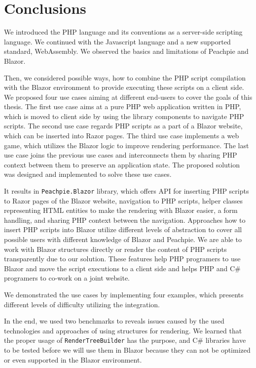 \chapter{Conclusions}

We introduced the PHP language and its conventions as a server-side scripting language.
We continued with the Javascript language and a new supported standard, WebAssembly.
We observed the basics and limitations of Peachpie and Blazor.
\par
Then, we considered possible ways, how to combine the PHP script compilation with the Blazor environment to provide executing these scripts on a client side.
We proposed four use cases aiming at different end-users to cover the goals of this thesis.
The first use case aims at a pure PHP web application written in PHP, which is moved to client side by using the library components to navigate PHP scripts.
The second use case regards PHP scripts as a part of a Blazor website, which can be inserted into Razor pages.
The third use case implements a web game, which utilizes the Blazor logic to improve rendering performance.
The last use case joins the previous use cases and interconnects them by sharing PHP context between them to preserve an application state.  
The proposed solution was designed and implemented to solve these use cases.
\par
It results in \texttt{Peachpie.Blazor} library, which offers API for inserting PHP scripts to Razor pages of the Blazor website, navigation to PHP scripts, helper classes representing HTML entities to make the rendering with Blazor easier, a form handling, and sharing PHP context between the navigation.
Approaches how to insert PHP scripts into Blazor utilize different levels of abstraction to cover all possible users with different knowledge of Blazor and Peachpie.
We are able to work with Blazor structures directly or render the content of PHP scripts transparently due to our solution.
These features help PHP programers to use Blazor and move the script executions to a client side and helps PHP and C\# programers to co-work on a joint website.
\par
We demonstrated the use cases by implementing four examples, which presents different levels of difficulty utilizing the integration.
\par
In the end, we used two benchmarks to reveals issues caused by the used technologies and approaches of using structures for rendering.
We learned that the proper usage of \texttt{RenderTreeBuilder} has the purpose, and C\# libraries have to be tested before we will use them in Blazor because they can not be optimized or even supported in the Blazor environment.

